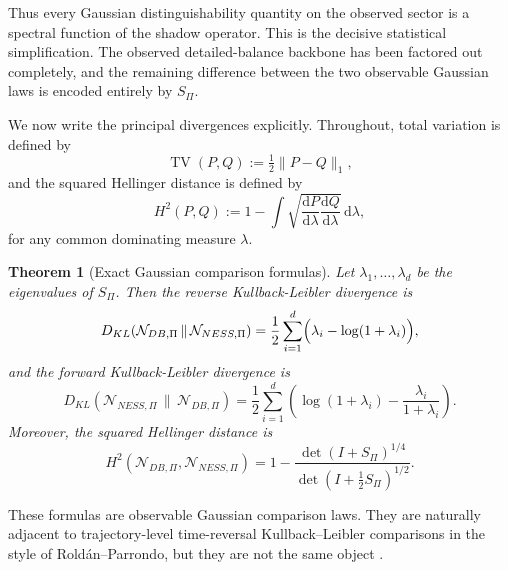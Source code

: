 \documentclass[11pt,a4paper]{article}
\numberwithin{equation}{section}
\theoremstyle{thmcompact}
\newtheorem{theorem}{Theorem}[section]
\theoremstyle{remark}
\begin{document}
Thus every Gaussian distinguishability quantity on the observed sector is a spectral function of the shadow operator. This is the decisive statistical simplification. The observed detailed-balance backbone has been factored out completely, and the remaining difference between the two observable Gaussian laws is encoded entirely by \(S_\Pi\).

We now write the principal divergences explicitly. Throughout, total variation is defined by
\begin{equation}
\operatorname{TV}(P,Q):=\tfrac12\|P-Q\|_1,
\end{equation}
and the squared Hellinger distance is defined by
\begin{equation}
H^2(P,Q):=1-\int \sqrt{\frac{\mathrm d P}{\mathrm d \lambda}\frac{\mathrm d Q}{\mathrm d \lambda}}\,\mathrm d\lambda,
\end{equation}
for any common dominating measure \(\lambda\).

\begin{theorem}[Exact Gaussian comparison formulas]
\label{thm:exact_gaussian_comparison_formulas}
Let \(\lambda_1,\dots,\lambda_d\) be the eigenvalues of \(S_\Pi\). Then the reverse Kullback-Leibler divergence is
\begin{equation}
D_{KL}\!\left(\mathcal N_{DB,\Pi}\,\|\,\mathcal N_{NESS,\Pi}\right)
=
\frac12\sum_{i=1}^{d}\Bigl(\lambda_i-\log(1+\lambda_i)\Bigr),
\end{equation}
and the forward Kullback-Leibler divergence is
\begin{equation}
D_{KL}\!\left(\mathcal N_{NESS,\Pi}\,\|\,\mathcal N_{DB,\Pi}\right)
=
\frac12\sum_{i=1}^{d}
\left(
\log(1+\lambda_i)-\frac{\lambda_i}{1+\lambda_i}
\right).
\end{equation}
Moreover, the squared Hellinger distance is
\begin{equation}
H^2\!\left(\mathcal N_{DB,\Pi},\mathcal N_{NESS,\Pi}\right)
=
1-
\frac{\det(I+S_\Pi)^{1/4}}{\det(I+\tfrac12 S_\Pi)^{1/2}}.
\end{equation}
\end{theorem}

These formulas are observable Gaussian comparison laws. They are naturally adjacent to trajectory-level time-reversal Kullback--Leibler comparisons in the style of Rold\'an--Parrondo, but they are not the same object \cite{RoldanParrondo2012}.
\end{document}
